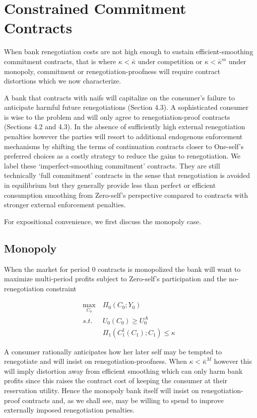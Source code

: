 \documentclass[11pt,english]{article}
\theoremstyle{plain}
\theoremstyle{definition}
\begin{document}
\section{Constrained Commitment Contracts }

\label{sec:imperfectK}

When bank renegotiation costs are not high enough to sustain efficient-smoothing
commitment contracts, that is where $\kappa<\bar{\kappa}$ under competition
or $\kappa<\bar{\kappa}^{m}$ under monopoly, commitment or renegotiation-proofness
will require contract distortions which we now characterize.

A bank that contracts with naifs will capitalize on the consumer's
failure to anticipate harmful future renegotiations (Section 4.3).
A sophisticated consumer is wise to the problem and will only agree
to renegotiation-proof contracts (Sections 4.2 and 4.3). In the absence
of sufficiently high external renegotiation penalties however the
parties will resort to additional endogenous enforcement mechanisms
by shifting the terms of continuation contracts closer to One-self's
preferred choices as a costly strategy to reduce the gains to renegotiation.
We label these `imperfect-smoothing commitment' contracts. They are
still technically `full commitment' contracts in the sense that renegotiation
is avoided in equilibrium but they generally provide less than perfect
or efficient consumption smoothing from Zero-self's perspective compared
to contracts with stronger external enforcement penalties.

For expositional convenience, we first discuss the monopoly case.

\subsection{Monopoly}

When the market for period 0 contracts is monopolized the bank will
want to maximize multi-period profits subject to Zero-self's participation
and the no-renegotiation constraint

\begin{align}
\max_{C_{0}} & \ \Pi_{0}\left(C_{0};Y_{0}\right)\\
s.t. & \ U_{0}\left(C_{0}\right)\geq U_{0}^{A}\\
 & \ \Pi_{1}\left(C_{1}^{1}\left(C_{1}\right);C_{1}\right)\leq\kappa\label{eq:rpc-m}
\end{align}

A consumer rationally anticipates how her later self may be tempted
to renegotiate and will insist on renegotiation-proofness. When $\kappa<\bar{\kappa}^{M}$
however this will imply distortion away from efficient smoothing which
can only harm bank profits since this raises the contract cost of
keeping the consumer at their reservation utility. Hence the monopoly
bank itself will insist on renegotiation-proof contracts and, as we
shall see, may be willing to spend to improve externally imposed renegotiation
penalties.
\end{document}

